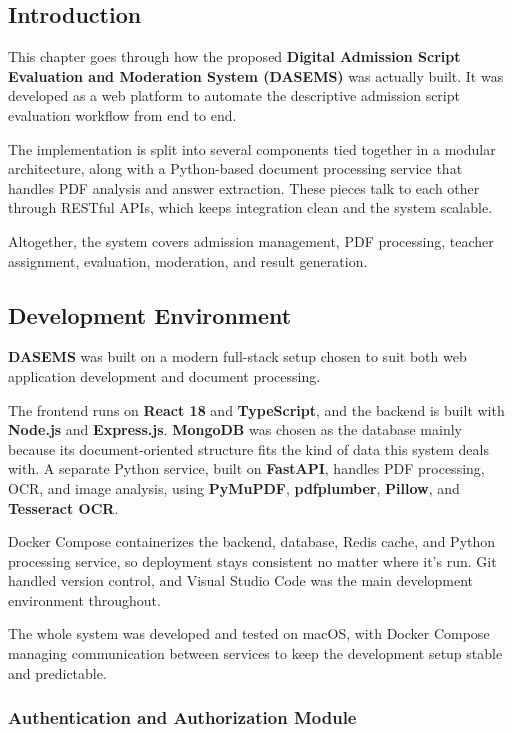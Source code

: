 \vspace{0.5cm}

\subsection{Introduction}

This chapter goes through how the proposed \textbf{Digital Admission Script Evaluation and Moderation System (DASEMS)} was actually built. It was developed as a web platform to automate the descriptive admission script evaluation workflow from end to end.

The implementation is split into several components tied together in a modular architecture, along with a Python-based document processing service that handles PDF analysis and answer extraction. These pieces talk to each other through RESTful APIs, which keeps integration clean and the system scalable.

Altogether, the system covers admission management, PDF processing, teacher assignment, evaluation, moderation, and result generation.

\subsection{Development Environment}

\textbf{DASEMS} was built on a modern full-stack setup chosen to suit both web application development and document processing.

The frontend runs on \textbf{React 18} and \textbf{TypeScript}, and the backend is built with \textbf{Node.js} and \textbf{Express.js}. \textbf{MongoDB} was chosen as the database mainly because its document-oriented structure fits the kind of data this system deals with. A separate Python service, built on \textbf{FastAPI}, handles PDF processing, OCR, and image analysis, using \textbf{PyMuPDF}, \textbf{pdfplumber}, \textbf{Pillow}, and \textbf{Tesseract OCR}.

Docker Compose containerizes the backend, database, Redis cache, and Python processing service, so deployment stays consistent no matter where it's run. Git handled version control, and Visual Studio Code was the main development environment throughout.

The whole system was developed and tested on macOS, with Docker Compose managing communication between services to keep the development setup stable and predictable.

\subsubsection{Authentication and Authorization Module}

